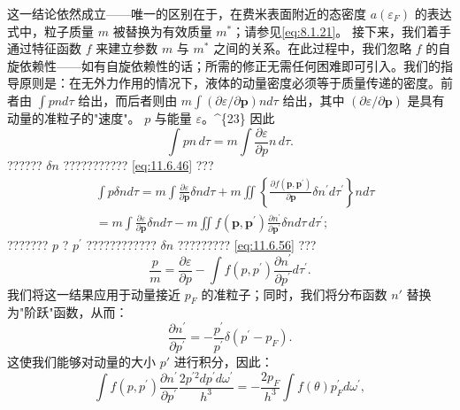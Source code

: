 这一结论依然成立——唯一的区别在于，在费米表面附近的态密度 \(a(\varepsilon_F)\) 的表达式中，粒子质量 \(m\) 被替换为有效质量 \(m^*\)；请参见\autoref{eq:8.1.21}。
接下来，我们着手通过特征函数 \(f\) 来建立参数 \(m\) 与 \(m^{*}\) 之间的关系。在此过程中，我们忽略 \(f\) 的自旋依赖性——如有自旋依赖性的话；所需的修正无需任何困难即可引入。我们的指导原则是：在无外力作用的情况下，液体的动量密度必须等于质量传递的密度。前者由 \(\int p n d \tau\) 给出，而后者则由 \(m \int (\partial \varepsilon / \partial \mathbf{p}) n d \tau\) 给出，其中 \((\partial \varepsilon / \partial \mathbf{p})\) 是具有动量的准粒子的"速度"。
\(p\) 与能量 \(\varepsilon\)。\^{}\{23\} 因此
\begin{equation}\tag{11.6.56}\label{eq:11.6.56}
\int p n \, d \tau = m \int { \frac { \partial \varepsilon } { \partial p } } n \, d \tau .
\end{equation}
?????? \(\delta n\) ??????????? \autoref{eq:11.6.46} ???
\begin{equation}\tag{11.6.57}\label{eq:11.6.57}
\begin{array}{rl} & { \int p \delta n d \tau = m \int \frac { \partial \varepsilon } { \partial \pmb { p } } \delta n d \tau + m \iint \left\{ \frac { \partial f ( \pmb { p } , \pmb { p } ^{\prime} ) } { \partial \pmb { p } } \delta n ^{\prime} d \tau ^{\prime} \right\} n d \tau } \\& {  = m \int \frac { \partial \varepsilon } { \partial \pmb { p } } \delta n d \tau - m \iint f ( \pmb { p } , \pmb { p } ^{\prime} ) \frac { \partial n ^{\prime} } { \partial \pmb { p } ^{\prime} } \delta n d \tau \, d \tau ^{\prime} ; } \end{array}
\end{equation}
??????? \(p\) ? \(p^{\prime}\) ???????????? \(\delta n\) ????????? \autoref{eq:11.6.56} ???
\begin{equation}\tag{11.6.58}\label{eq:11.6.58}
\frac { p } { m } = \frac { \partial \varepsilon } { \partial p } - \int f ( p , p ^{\prime} ) \frac { \partial n ^{\prime} } { \partial p ^{\prime} } d \tau ^{\prime} .
\end{equation}
我们将这一结果应用于动量接近 \(p_{F}\) 的准粒子；同时，我们将分布函数 \(n'\) 替换为"阶跃"函数，从而：
\begin{equation}\tag{11.6.59}\label{eq:11.6.59}
\frac { \partial n ^{\prime} } { \partial p ^{\prime} } = - \frac { p ^{\prime} } { p ^{\prime} } \delta ( p ^{\prime} - p _ { F } ) .
\end{equation}
这使我们能够对动量的大小 \(p'\) 进行积分，因此：
\begin{equation}\tag{11.6.60}\label{eq:11.6.60}
\int f ( p , p ^{\prime} ) \frac { \partial n ^{\prime} } { \partial p ^{\prime} } \frac { 2 p ^{\prime 2} d p ^{\prime} d \omega ^{\prime} } { h ^{3} } = - \frac { 2 p _ { F } } { h ^{3} } \int f ( \theta ) p _ { F } ^{\prime} d \omega ^{\prime} ,
\end{equation}

